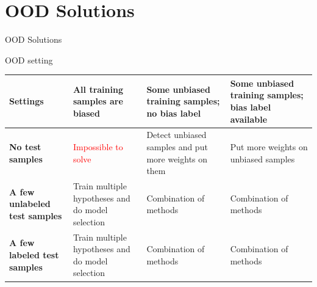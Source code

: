 \documentclass[aspectratio=169]{beamer}
\begin{document}
\section{OOD Solutions}

\begin{frame}[plain]
    \centering
    \vfill
    {OOD Solutions \par}
    \vfill
  \end{frame}

\begin{frame}{OOD setting}

    \renewcommand{\arraystretch}{1.25}
    \setlength{\tabcolsep}{6pt}
    \begin{table}
    \centering
    \scriptsize
    \begin{tabular}{p{2.6cm} p{3.3cm} p{3.3cm} p{3.6cm}}
        \toprule
        \textbf{Settings} &
        \textbf{All training samples are biased} &
        \textbf{Some unbiased training samples; no bias label} &
        \textbf{Some unbiased training samples; bias label available} \\
        \midrule
        \textbf{No test samples} &
        \textcolor{red}{Impossible to solve} &
        Detect unbiased samples and put more weights on them &
        Put more weights on unbiased samples \\
        \midrule
        \textbf{A few unlabeled test samples} &
        Train multiple hypotheses and do model selection &
        Combination of methods &
        Combination of methods \\
        \midrule
        \textbf{A few labeled test samples} &
        Train multiple hypotheses and do model selection &
        Combination of methods &
        Combination of methods \\
        \bottomrule
    \end{tabular}
    \end{table}
\end{frame}
\end{document}
